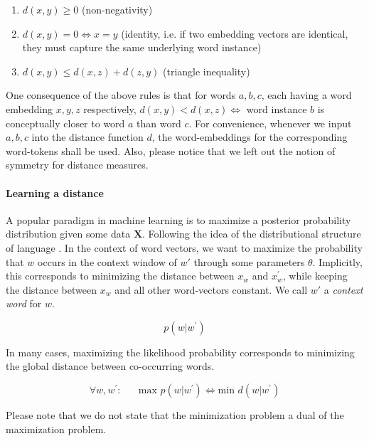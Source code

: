 \documentclass[a4paper,12pt,oneside,openright]{report}
\begin{document}
\begin{enumerate}
\item $d(x, y) \geq 0$ (non-negativity)
\item $d(x, y) = 0 \iff x = y$ (identity, i.e. if two embedding vectors are identical, they must capture the same underlying word instance)
\item $d(x, y) \leq d(x, z) + d(z, y)$ (triangle inequality)
\end{enumerate}{\label{def:distance}}

One consequence of the above rules is that for words $a, b, c$, each having a word embedding $x, y, z$ respectively, $d(x, y) < d(x, z) \iff $ word instance $b$ is conceptually closer to word $a$ than word $c$.
For convenience, whenever we input $a, b, c$ into the distance function $d$, the word-embeddings for the corresponding word-tokens shall be used.
Also, please notice that we left out the notion of symmetry for distance measures.

\paragraph{Learning a distance}
A popular paradigm in machine learning is to maximize a posterior probability distribution given some data $\mathbf{X}$.
Following the idea of the distributional structure of language \cite{harris54}.
In the context of word vectors, we want to maximize the probability that $w$ occurs in the context window of $w \prime$ through some parameters $\theta$.
Implicitly, this corresponds to minimizing the distance between $x_w$ and $x_w^{\prime}$, while keeping the distance between $x_w$ and all other word-vectors constant. 
We call $w \prime$ a \textit{context word} for $w$.

\begin{equation}
p \left(w | w^{\prime}\right)
\end{equation}

In many cases, maximizing the likelihood probability corresponds to minimizing the global distance between co-occurring words.

\begin{equation}
\forall w, w^{\prime} : \hspace{20pt} \text{max } p \left(w | w^{\prime}\right) \iff \text{min } d(w | w^{\prime})
\end{equation}

Please note that we do not state that the minimization problem a dual of the maximization problem.
\end{document}

